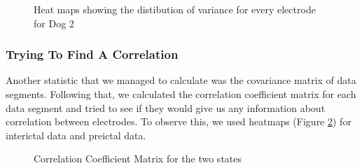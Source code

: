 \documentclass[a4paper]{article}
\begin{document}
\begin{figure}[H]
    \centering
    \qquad
    \caption{Heat maps showing the distibution of variance for every electrode for Dog  2}%
    \label{fig:heatvar}%
\end{figure}

\subsubsection{Trying To Find A Correlation}

Another statistic that we managed to calculate was the covariance matrix of data segments. Following that, we calculated the correlation coefficient matrix for each data segment and tried to see if they would give us any information about correlation between electrodes. To observe this, we used heatmaps (Figure \ref{fig:corrMatrix}) for interictal data and preictal data.

\begin{figure}[H]
    \centering
    \qquad
    \caption{Correlation Coefficient Matrix for the two states}%
    \label{fig:corrMatrix}%
\end{figure}
\end{document}
